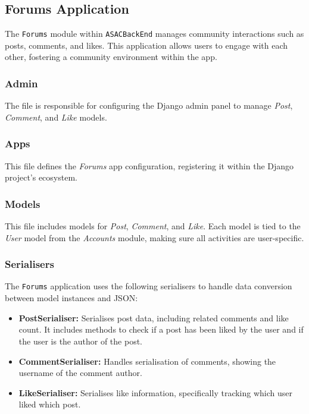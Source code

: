 \subsection{Forums Application}

The \texttt{Forums} module within \texttt{ASACBackEnd} manages community interactions such as posts, comments, and likes. This application allows users to engage with each other, fostering a community environment within the app.

\subsubsection{Admin}

The file is responsible for configuring the Django admin panel to manage \textit{Post}, \textit{Comment}, and \textit{Like} models.

\subsubsection{Apps}

This file defines the \textit{Forums} app configuration, registering it within the Django project's ecosystem.

\subsubsection{Models} 

This file includes models for \textit{Post}, \textit{Comment}, and \textit{Like}. Each model is tied to the \textit{User} model from the \textit{Accounts} module,  making sure all activities are user-specific.

\subsubsection{Serialisers}

The \texttt{Forums} application uses the following serialisers to handle data conversion between model instances and JSON:
\begin{itemize}
    \item \textbf{PostSerialiser:} Serialises post data, including related comments and like count. It includes methods to check if a post has been liked by the user and if the user is the author of the post.
    \item \textbf{CommentSerialiser:} Handles serialisation of comments, showing the username of the comment author.
    \item \textbf{LikeSerialiser:} Serialises like information, specifically tracking which user liked which post.
\end{itemize}

